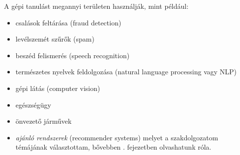 \documentclass[
]{thesis-ekf}
\theoremstyle{definition}
\theoremstyle{remark}
\begin{document}
	A gépi tanulást megannyi területen használják, mint például: 
	\begin{itemize}
		\item csalások feltárása (fraud detection)
		\item levélszemét szűrők (spam)
		\item beszéd felismerés (speech recognition)
		\item természetes nyelvek feldolgozása (natural language processing vagy NLP)
		\item gépi látás (computer vision)
		\item egészségügy
		\item önvezető járművek
		\item \emph{ajánló rendszerek} (recommender systems) melyet a szakdolgozatom témájának választottam, bővebben . fejezetben olvashatunk róla.
	\end{itemize}
\end{document}
